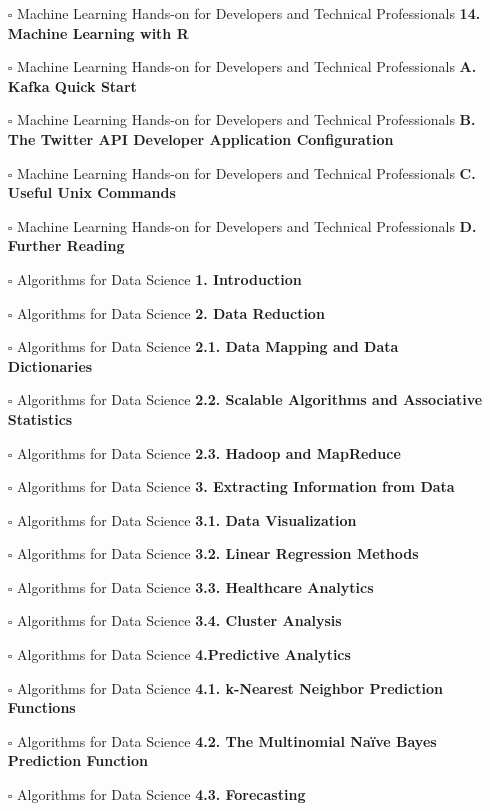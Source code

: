 \documentclass[a4, landscape, 12pt]{article}
\newcommand{\checkbox}{$\square$}%
\begin{document}
\begin{itemize}
{}
\item [\checkbox]  Machine Learning Hands-on for Developers and Technical Professionals \textbf{ 14. Machine Learning with R
}
\item [\checkbox]  Machine Learning Hands-on for Developers and Technical Professionals \textbf{ A. Kafka Quick Start
}
\item [\checkbox]  Machine Learning Hands-on for Developers and Technical Professionals \textbf{ B. The Twitter API Developer Application Configuration
}
\item [\checkbox]  Machine Learning Hands-on for Developers and Technical Professionals \textbf{ C. Useful Unix Commands
}
\item [\checkbox]  Machine Learning Hands-on for Developers and Technical Professionals \textbf{ D. Further Reading
}
\item [\checkbox]  Algorithms for Data Science \textbf{ 1. Introduction
}
\item [\checkbox]  Algorithms for Data Science \textbf{ 2. Data Reduction
}
\item [\checkbox]  Algorithms for Data Science \textbf{ 2.1. Data Mapping and Data Dictionaries
}
\item [\checkbox]  Algorithms for Data Science \textbf{ 2.2. Scalable Algorithms and Associative Statistics
}
\item [\checkbox]  Algorithms for Data Science \textbf{ 2.3. Hadoop and MapReduce
}
\item [\checkbox]  Algorithms for Data Science \textbf{ 3. Extracting Information from Data
}
\item [\checkbox]  Algorithms for Data Science \textbf{ 3.1. Data Visualization
}
\item [\checkbox]  Algorithms for Data Science \textbf{ 3.2. Linear Regression Methods
}
\item [\checkbox]  Algorithms for Data Science \textbf{ 3.3. Healthcare Analytics
}
\item [\checkbox]  Algorithms for Data Science \textbf{ 3.4. Cluster Analysis
}
\item [\checkbox]  Algorithms for Data Science \textbf{ 4.Predictive Analytics
}
\item [\checkbox]  Algorithms for Data Science \textbf{ 4.1. k-Nearest Neighbor Prediction Functions
}
\item [\checkbox]  Algorithms for Data Science \textbf{ 4.2. The Multinomial Naïve Bayes Prediction Function
}
\item [\checkbox]  Algorithms for Data Science \textbf{ 4.3. Forecasting
}
\end{itemize}
\end{document}
